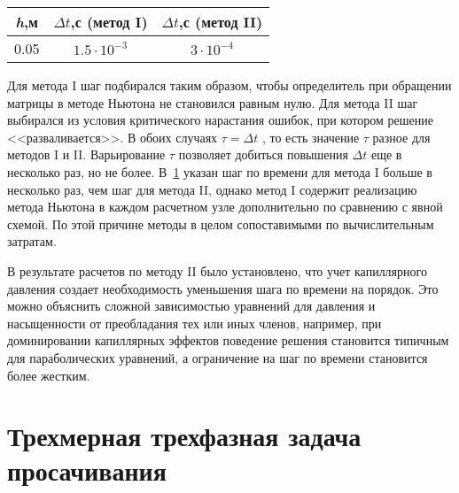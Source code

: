 \begin{table}[!ht]
\centering
\begin{tabular}{|c|c|c|}
\hline
\textit {h},м & $\Delta t$,с (метод I) & $\Delta t$,с (метод II) \\
\hline
0.05 & $1.5\cdot10^{-3}$ & $3\cdot10^{-4}$ \\
\hline
\end{tabular}
\label{tabular:limits}
\end{table}

Для метода I шаг подбирался таким образом, чтобы определитель при обращении матрицы в методе
Ньютона не становился равным нулю. Для метода II шаг выбирался из
условия критического нарастания ошибок, при котором решение <<разваливается>>.
В обоих случаях $\tau=\Delta t$ , то есть значение $\tau$ разное для методов I и II. Варьирование $\tau$ позволяет добиться
повышения $\Delta t$ еще в несколько раз, но не более.
В~\ref{tabular:limits} указан шаг
по времени для метода I больше в несколько раз, чем шаг для метода II, однако
метод I содержит реализацию метода Ньютона в каждом расчетном узле дополнительно по сравнению с явной схемой. По этой причине методы в целом сопоставимыми по вычислительным затратам.

В результате расчетов по методу II было установлено, что учет капиллярного
давления создает необходимость уменьшения шага по времени на порядок. Это можно объяснить сложной зависимостью уравнений для давления и насыщенности от преобладания тех или иных членов, например, при
доминировании капиллярных эффектов поведение решения становится типичным для
параболических уравнений, а ограничение на шаг по времени становится более жестким.

\section{Трехмерная трехфазная задача просачивания} \label{ch:ch3/sect3}

